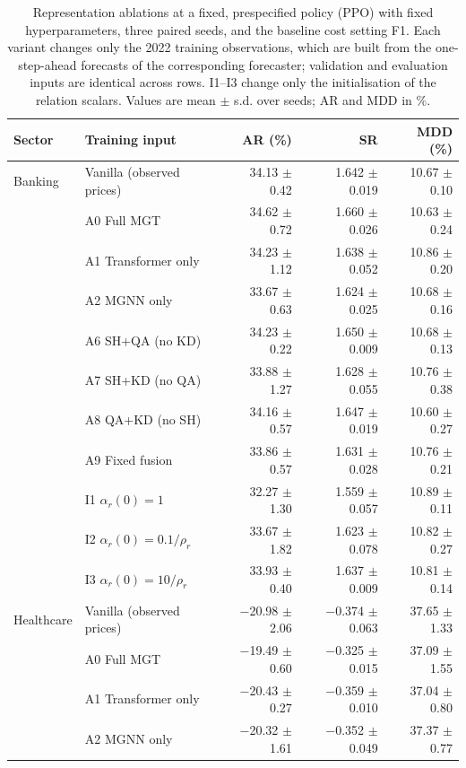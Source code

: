 \begin{table}[!t]\centering\small\color{blue}
\caption{Representation ablations at a fixed, prespecified policy (PPO) with fixed hyperparameters, three paired seeds, and the baseline cost setting F1. Each variant changes only the 2022 training observations, which are built from the one-step-ahead forecasts of the corresponding forecaster; validation and evaluation inputs are identical across rows. I1--I3 change only the initialisation of the relation scalars. Values are mean $\pm$ s.d. over seeds; AR and MDD in \%.}
\label{tab:ablation_ppo}
\setlength{\tabcolsep}{4pt}
\begin{tabular}{llrrr}\toprule
Sector & Training input & AR (\%) & SR & MDD (\%) \\ \midrule
Banking & Vanilla (observed prices) & 34.13 $\pm$ 0.42 & 1.642 $\pm$ 0.019 & 10.67 $\pm$ 0.10 \\
 & A0 Full MGT & 34.62 $\pm$ 0.72 & 1.660 $\pm$ 0.026 & 10.63 $\pm$ 0.24 \\
 & A1 Transformer only & 34.23 $\pm$ 1.12 & 1.638 $\pm$ 0.052 & 10.86 $\pm$ 0.20 \\
 & A2 MGNN only & 33.67 $\pm$ 0.63 & 1.624 $\pm$ 0.025 & 10.68 $\pm$ 0.16 \\
 & A6 SH+QA (no KD) & 34.23 $\pm$ 0.22 & 1.650 $\pm$ 0.009 & 10.68 $\pm$ 0.13 \\
 & A7 SH+KD (no QA) & 33.88 $\pm$ 1.27 & 1.628 $\pm$ 0.055 & 10.76 $\pm$ 0.38 \\
 & A8 QA+KD (no SH) & 34.16 $\pm$ 0.57 & 1.647 $\pm$ 0.019 & 10.60 $\pm$ 0.27 \\
 & A9 Fixed fusion & 33.86 $\pm$ 0.57 & 1.631 $\pm$ 0.028 & 10.76 $\pm$ 0.21 \\
 & I1 $\alpha_r(0)=1$ & 32.27 $\pm$ 1.30 & 1.559 $\pm$ 0.057 & 10.89 $\pm$ 0.11 \\
 & I2 $\alpha_r(0)=0.1/\rho_r$ & 33.67 $\pm$ 1.82 & 1.623 $\pm$ 0.078 & 10.82 $\pm$ 0.27 \\
 & I3 $\alpha_r(0)=10/\rho_r$ & 33.93 $\pm$ 0.40 & 1.637 $\pm$ 0.009 & 10.81 $\pm$ 0.14 \\
\midrule
Healthcare & Vanilla (observed prices) & $-$20.98 $\pm$ 2.06 & $-$0.374 $\pm$ 0.063 & 37.65 $\pm$ 1.33 \\
 & A0 Full MGT & $-$19.49 $\pm$ 0.60 & $-$0.325 $\pm$ 0.015 & 37.09 $\pm$ 1.55 \\
 & A1 Transformer only & $-$20.43 $\pm$ 0.27 & $-$0.359 $\pm$ 0.010 & 37.04 $\pm$ 0.80 \\
 & A2 MGNN only & $-$20.32 $\pm$ 1.61 & $-$0.352 $\pm$ 0.049 & 37.37 $\pm$ 0.77 \\

\end{tabular}
\end{table}
